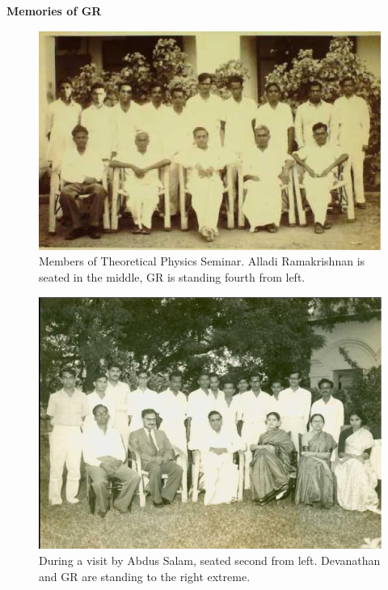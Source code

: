 \eject

\begin{center}
{\bf \Large Memories of GR\@IMSc}
\end{center}

\begin{figure}[H]
\centering
\includegraphics[scale=0.52]{src/images/chap25/2.eps}
\caption{Members of Theoretical Physics Seminar. Alladi Ramakrishnan is seated
in the middle, GR is standing fourth from left.}
\end{figure}

\begin{figure}[H]
\centering
\includegraphics[scale=0.25]{src/images/chap25/3.eps}
\caption{During a visit by Abdus Salam, seated second from left. Devanathan and
GR are standing to the right extreme.}
\end{figure}

